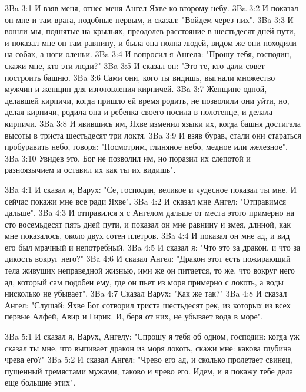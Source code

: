 \vs 3Ba 3:1
И взяв меня, отнес меня Ангел Яхве ко второму небу.
\vs 3Ba 3:2
И показал он мне и там врата, подобные первым, и сказал: "Войдем через них".
\vs 3Ba 3:3
И вошли мы, поднятые на крыльях, преодолев расстояние в шестьдесят дней пути, и показал мне он там равнину, и была она полна людей, видом же они походили на собак, а ноги оленьи.
\vs 3Ba 3:4
И вопросил я Ангела: "Прошу тебя, господин, скажи мне, кто эти люди?"
\vs 3Ba 3:5
И сказал он: "Это те, кто дали совет построить башню.
\vs 3Ba 3:6
Сами они, кого ты видишь, выгнали множество мужчин и женщин для изготовления кирпичей.
\vs 3Ba 3:7
Женщине одной, делавшей кирпичи, когда пришло ей время родить, не позволили они уйти, но, делая кирпичи, родила она и ребенка своего носила в полотенце, и делала кирпичи.
\vs 3Ba 3:8
И явившись им, Яхве изменил языки их, когда башня достигала высоты в триста шестьдесят три локтя.
\vs 3Ba 3:9
И взяв бурав, стали они стараться пробуравить небо, говоря: "Посмотрим, глиняное небо, медное или железное".
\vs 3Ba 3:10
Увидев это, Бог не позволил им, но поразил их слепотой и разноязычием и оставил их как ты их видишь".

\vs 3Ba 4:1
И сказал я, Варух: "Се, господин, великое и чудесное показал ты мне. И сейчас покажи мне все ради Яхве".
\vs 3Ba 4:2
И сказал мне Ангел: "Отправимся дальше".
\vs 3Ba 4:3
И отправился я с Ангелом дальше от места этого примерно на сто восемьдесят пять дней пути, и показал он мне равнину и змея, длиной, как мне показалось, около двух сотен плетров.
\vs 3Ba 4:4
И показал он мне ад, и вид его был мрачный и непотребный.
\vs 3Ba 4:5
И сказал я: "Что это за дракон, и что за дикость вокруг него?"
\vs 3Ba 4:6
И сказал Ангел: "Дракон этот есть пожирающий тела живущих неправедной жизнью, ими же он питается, то же, что вокруг него ад, который сам подобен ему, где он пьет из моря примерно с локоть, а воды нисколько не убывает".
\vs 3Ba 4:7
Сказал Варух: "Как же так?"
\vs 3Ba 4:8
И сказал Ангел: "Слушай: Яхве Бог сотворил триста шестьдесят рек, из которых из всех первые Алфей, Авир и Гирик. И, беря от них, не убывает вода в море".

\vs 3Ba 5:1
И сказал я, Варух, Ангелу: "Спрошу я тебя об одном, господин: когда уж сказал ты мне, что выпивает дракон из моря локоть, скажи мне: какова глубина чрева его?"
\vs 3Ba 5:2
И сказал Ангел: "Чрево его ад, и сколько пролетает свинец, пущенный тремястами мужами, таково и чрево его. Идем, и я покажу тебе дела еще большие этих".

